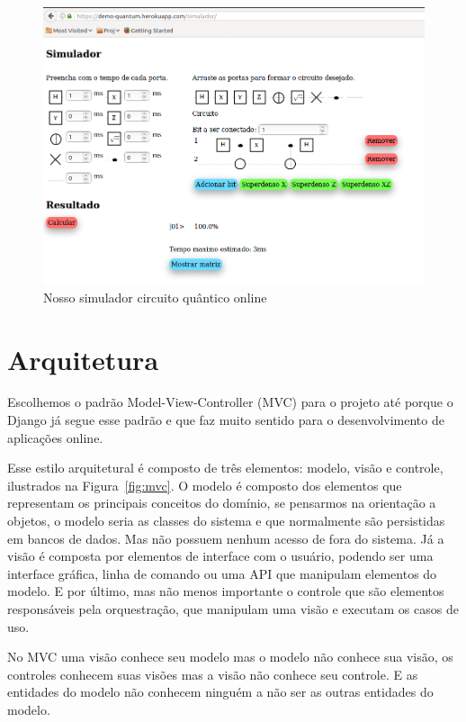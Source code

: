 \documentclass[a4paper, 12pt, oneside]{book}
\begin{document}
\begin{figure}[H]
\centering
\includegraphics[scale=0.4]{simulador-pagina.png}
\caption{Nosso simulador circuito quântico online}
\label{fig:simulador}
\end{figure}

\section{Arquitetura}

Escolhemos o padrão Model-View-Controller (MVC) para o projeto até porque o Django já segue esse padrão e que faz muito sentido para o desenvolvimento de aplicações online.

Esse estilo arquitetural é composto de três elementos: modelo, visão e controle, ilustrados na Figura~\ref{fig:mvc}. O modelo é composto dos elementos que representam os principais conceitos do domínio, se pensarmos na orientação a objetos, o modelo seria as classes do sistema e que normalmente são persistidas em bancos de dados. Mas não possuem nenhum acesso de fora do sistema. Já a visão é composta por elementos de interface com o usuário, podendo ser uma interface gráfica, linha de comando ou uma API que manipulam elementos do modelo. E por último, mas não menos importante o controle que são elementos responsáveis pela orquestração, que manipulam uma visão e executam os casos de uso.

No MVC uma visão conhece seu modelo mas o modelo não conhece sua visão, os controles conhecem suas visões mas a visão não conhece seu controle. E as entidades do modelo não conhecem ninguém a não ser as outras entidades do modelo.
\end{document}
